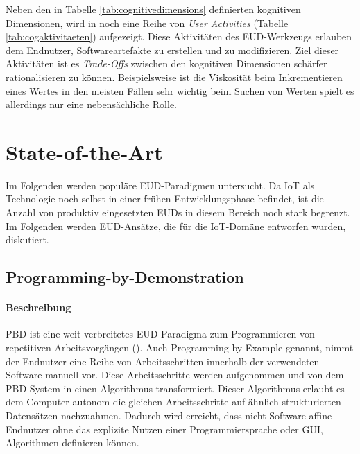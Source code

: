 Neben den in Tabelle \ref{tab:cognitivedimensions} definierten kognitiven Dimensionen, wird in \cite{green2000instructions} noch eine Reihe von \textit{User Activities} (Tabelle \ref{tab:cogaktivitaeten}) aufgezeigt. Diese Aktivitäten des \ac{EUD}-Werkzeugs erlauben dem Endnutzer, Softwareartefakte zu erstellen und zu modifizieren. Ziel dieser Aktivitäten ist es \textit{Trade-Offs} zwischen den kognitiven Dimensionen schärfer rationalisieren zu können. Beispielsweise ist die Viskosität beim Inkrementieren eines Wertes in den meisten Fällen sehr wichtig beim Suchen von Werten spielt es allerdings nur eine nebensächliche Rolle. 

\section{State-of-the-Art}\label{subsec:stateoftheart}
Im Folgenden werden populäre \ac{EUD}-Paradigmen untersucht. Da \ac{IoT} als Technologie noch selbst in einer frühen Entwicklungsphase befindet, ist die Anzahl von produktiv eingesetzten \acp{EUD} in diesem Bereich noch stark begrenzt. Im Folgenden werden \ac{EUD}-Ansätze, die für die \ac{IoT}-Domäne entworfen wurden, diskutiert.

\subsection{Programming-by-Demonstration}
\paragraph{Beschreibung} \acf{PBD} ist eine weit verbreitetes \ac{EUD}-Paradigma zum Programmieren von repetitiven Arbeitsvorgängen (\cite{cypher1993pbd}). Auch Programming-by-Example genannt, nimmt der Endnutzer eine Reihe von Arbeitsschritten innerhalb der verwendeten Software manuell vor. Diese Arbeitsschritte werden aufgenommen und von dem \ac{PBD}-System in einen Algorithmus transformiert. Dieser Algorithmus erlaubt es dem Computer autonom die gleichen Arbeitsschritte auf ähnlich strukturierten Datensätzen nachzuahmen. Dadurch wird erreicht, dass nicht Software-affine Endnutzer ohne das explizite Nutzen einer Programmiersprache oder \ac{GUI}, Algorithmen definieren können.

